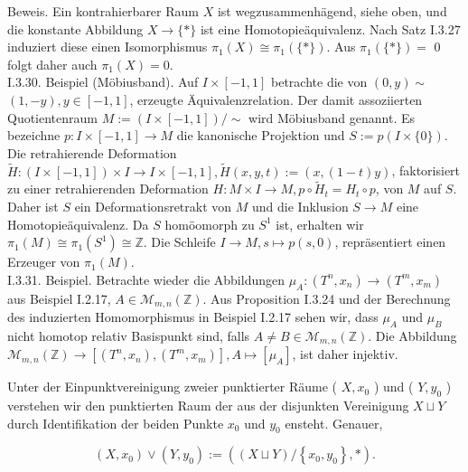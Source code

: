 \documentclass[10pt]{article}
\begin{document}
Beweis. Ein kontrahierbarer Raum $X$ ist wegzusammenhägend, siehe oben, und die konstante Abbildung $X \rightarrow\{*\}$ ist eine Homotopieäquivalenz. Nach Satz I.3.27 induziert diese einen Isomorphismus $\pi_{1}(X) \cong \pi_{1}(\{*\})$. Aus $\pi_{1}(\{*\})=$ 0 folgt daher auch $\pi_{1}(X)=0$.\\
I.3.30. Beispiel (Möbiusband). Auf $I \times[-1,1]$ betrachte die von $(0, y) \sim$ $(1,-y), y \in[-1,1]$, erzeugte Äquivalenzrelation. Der damit assoziierten Quotientenraum $M:=(I \times[-1,1]) / \sim$ wird Möbiusband genannt. Es bezeichne $p: I \times[-1,1] \rightarrow M$ die kanonische Projektion und $S:=p(I \times\{0\})$. Die retrahierende Deformation $\tilde{H}:(I \times[-1,1]) \times I \rightarrow I \times[-1,1], \tilde{H}(x, y, t):=(x,(1-t) y)$, faktorisiert zu einer retrahierenden Deformation $H: M \times I \rightarrow M, p \circ \tilde{H}_{t}=H_{t} \circ p$, von $M$ auf $S$. Daher ist $S$ ein Deformationsretrakt von $M$ und die Inklusion $S \rightarrow M$ eine Homotopieäquivalenz. Da $S$ homöomorph zu $S^{1}$ ist, erhalten wir $\pi_{1}(M) \cong \pi_{1}\left(S^{1}\right) \cong \mathbb{Z}$. Die Schleife $I \rightarrow M, s \mapsto p(s, 0)$, repräsentiert einen Erzeuger von $\pi_{1}(M)$.\\
I.3.31. Beispiel. Betrachte wieder die Abbildungen $\mu_{A}:\left(T^{n}, x_{n}\right) \rightarrow\left(T^{m}, x_{m}\right)$ aus Beispiel I.2.17, $A \in \mathcal{M}_{m, n}(\mathbb{Z})$. Aus Proposition I.3.24 und der Berechnung des induzierten Homomorphismus in Beispiel I.2.17 sehen wir, dass $\mu_{A}$ und $\mu_{B}$ nicht homotop relativ Basispunkt sind, falls $A \neq B \in \mathcal{M}_{m, n}(\mathbb{Z})$. Die Abbildung $\mathcal{M}_{m, n}(\mathbb{Z}) \rightarrow\left[\left(T^{n}, x_{n}\right),\left(T^{m}, x_{m}\right)\right], A \mapsto\left[\mu_{A}\right]$, ist daher injektiv.

Unter der Einpunktvereinigung zweier punktierter Räume ( $X, x_{0}$ ) und ( $Y, y_{0}$ ) verstehen wir den punktierten Raum der aus der disjunkten Vereinigung $X \sqcup Y$ durch Identifikation der beiden Punkte $x_{0}$ und $y_{0}$ ensteht. Genauer,

$$
\left(X, x_{0}\right) \vee\left(Y, y_{0}\right):=\left((X \sqcup Y) /\left\{x_{0}, y_{0}\right\}, *\right) .
$$
\end{document}
